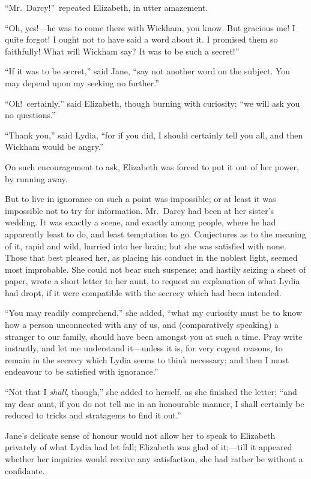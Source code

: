 \documentclass[12pt,english]{book}
\begin{document}
{}``Mr.\ Darcy!''\ repeated Elizabeth, in utter amazement.

{}``Oh, yes!\mbox{---}he was to come there with Wickham, you know.
But gracious me! I quite forgot! I ought not to have said a word about
it. I promised them so faithfully! What will Wickham say? It was to
be such a secret!''\ 

{}``If it was to be secret,'' said Jane, {}``say not another word
on the subject. You may depend upon my seeking no further.''

{}``Oh!\ certainly,'' said Elizabeth, though burning with curiosity;
{}``we will ask you no questions.''

{}``Thank you,'' said Lydia, {}``for if you did, I should certainly
tell you all, and then Wickham would be angry.''

On such encouragement to ask, Elizabeth was forced to put it out of
her power, by running away.

But to live in ignorance on such a point was impossible; or at least
it was impossible not to try for information. Mr.\ Darcy had been
at her sister's wedding. It was exactly a scene, and exactly among
people, where he had apparently least to do, and least temptation
to go. Conjectures as to the meaning of it, rapid and wild, hurried
into her brain; but she was satisfied with none. Those that best pleased
her, as placing his conduct in the noblest light, seemed most improbable.
She could not bear such suspense; and hastily seizing a sheet of paper,
wrote a short letter to her aunt, to request an explanation of what
Lydia had dropt, if it were compatible with the secrecy which had
been intended.

{}``You may readily comprehend,'' she added, {}``what my curiosity
must be to know how a person unconnected with any of us, and (comparatively
speaking) a stranger to our family, should have been amongst you at
such a time. Pray write instantly, and let me understand it\mbox{---}unless
it is, for very cogent reasons, to remain in the secrecy which Lydia
seems to think necessary; and then I must endeavour to be satisfied
with ignorance.''

{}``Not that I \textit{shall}, though,'' she added to herself, as
she finished the letter; {}``and my dear aunt, if you do not tell
me in an honourable manner, I shall certainly be reduced to tricks
and stratagems to find it out.''

Jane's delicate sense of honour would not allow her to speak to Elizabeth
privately of what Lydia had let fall; Elizabeth was glad of it;\mbox{---}till
it appeared whether her inquiries would receive any satisfaction,
she had rather be without a confidante.
\end{document}
